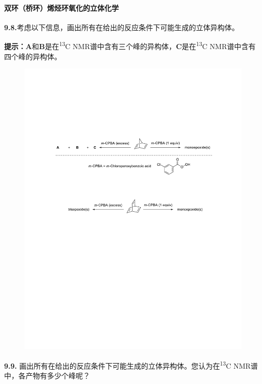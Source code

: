 \paragraph{双环（桥环）烯烃环氧化的立体化学}

\noindent\textbf{9.8.}考虑以下信息，画出所有在给出的反应条件下可能生成的立体异构体。

\noindent\textbf{提示：A}和\textbf{B}是在\textsuperscript{13}C NMR谱中含有三个峰的异构体，\textbf{C}是在\textsuperscript{13}C NMR谱中含有四个峰的异构体。

\begin{figure}[h]
	\centering
	\includegraphics[width=14cm]{./pic/t9-5.pdf}
\end{figure}

\noindent\textbf{9.9.}
画出所有在给出的反应条件下可能生成的立体异构体。您认为在\textsuperscript{13}C
NMR谱中，各产物有多少个峰呢？

